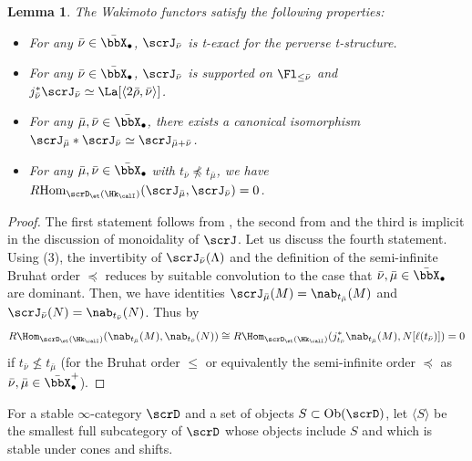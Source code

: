 \documentclass[10pt, reqno]{amsart}
\theoremstyle{plain}
\newtheorem{lemma}[theorem]{Lemma}
\theoremstyle{definition}
\numberwithin{equation}{section}
\begin{document}
	
	
	
	
	\begin{lemma} \label{lem_wak_basic_prop}
		The Wakimoto functors satisfy the following properties:
		\begin{itemize}
			\item [(1)] For any $\bar \nu\in\bar\bbX_{\bullet}$, $\scrJ_{\bar \nu}$ is t-exact for the perverse t-structure.
			\item [(2)] For any $\bar \nu\in\bar\bbX_{\bullet}$, $\scrJ_{\bar \nu}$ is supported on $\Fl_{\leq \bar \nu}$ and $j_{\bar \nu}^*\scrJ_{\bar \nu}\simeq \La[\langle 2\bar\rho, \bar\nu\rangle]$.
			\item[(3)] For any $\bar\mu,\bar\nu\in\bar \bbX_{\bullet}$, there exists a canonical isomorphism $\scrJ_{\bar\mu} *\scrJ_{\bar\nu}\simeq \scrJ_{\bar\mu+\bar\nu}$.
			\item [(4)] For any $\bar\mu,\bar\nu\in\bar \bbX_{\bullet}$ with $t_{\bar \nu}\npreceq t_{\bar \mu}$, we have $R\mathrm{Hom}_{\scrD_\et(\Hk_{\calI})}(\scrJ_{\bar\mu},\scrJ_{\bar\nu})= 0$. 
		\end{itemize}
	\end{lemma}
	
	\begin{proof}
		The first statement follows from , the second from  and the third is implicit in the discussion of monoidality of $\scrJ$.
		Let us discuss the fourth statement. Using (3), the invertibity of $\scrJ_{\bar \nu}(\Lambda)$ and the definition of the semi-infinite Bruhat order $\preceq$ reduces by suitable convolution to the case that $\bar\nu,\bar\mu\in \bar{\bbX}_\bullet$ are dominant. Then, we have identities $\scrJ_{\bar\mu}(M)=\nab_{t_{\bar\mu}}(M)$ and $\scrJ_{\bar\nu}(N)=\nab_{t_{\bar\nu}}(N)$.
		Thus by  
		\begin{equation}
			R\Hom_{\scrD_\et(\Hk_{\calI})}(\nab_{t_{\bar\mu}}(M),\nab_{t_{\bar\nu}}(N))\cong R\Hom_{\scrD_\et(\Hk_{\calI})}(j^\ast_{t_{\bar\nu}}\nab_{t_{\bar\mu}}(M),N[\ell(t_{\bar\nu})])=0 
		\end{equation}
		if $t_{\bar\nu}\nleq t_{\bar\mu}$ (for the Bruhat order $\leq$ or equivalently the semi-infinite order $\preceq$ as $\bar\nu,\bar\mu\in \bar{\bbX}_\bullet^+$). 
	\end{proof}
	
	For a stable $\infty$-category $\scrD$ and a set of objects $S \subset \mathrm{Ob}(\scrD)$, let $\langle S\rangle$ be the smallest full subcategory of $\scrD$ whose objects include $S$ and which is stable under cones and shifts.
	
\end{document}
